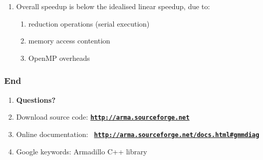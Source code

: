 \documentclass[usenames,dvipsnames]{beamer}
\def\_{{\tt\char95}}
\begin{document}
\begin{frame}
\begin{enumerate}[{~~$\boldsymbol{\bullet}$}]

\item Overall speedup is below the idealised linear speedup, due to:


\begin{enumerate}[{$\boldsymbol{\rightarrow}$}]
\scriptsize
\item reduction operations (serial execution)
\item memory access contention
\item OpenMP overheads
\end{enumerate}

\end{enumerate}


\end{frame}

%
%
%

\begin{frame}
\frametitle{End}

\begin{enumerate}[{~~$\boldsymbol{\bullet}$}]

\item
{\bf Questions?}
\vspace{1ex}

\item Download source code: \textcolor{red}{\href{http://arma.sourceforge.net}{\tt\textbf{http://arma.sourceforge.net}}}
\vspace{1ex}

\item Online documentation: ~\textcolor{red}{\href{http://arma.sourceforge.net/docs.html\#gmm_diag}{\tt\textbf{http://arma.sourceforge.net/docs.html\#gmm\_diag}}}
\vspace{1ex}

\item Google keywords: Armadillo C++ library
\vspace{1ex}

\end{enumerate}
\end{frame}

%
%
%

% 
% 
% 
% 
% 
% 
\end{document}
